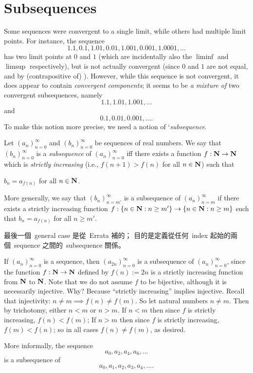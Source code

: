\section{Subsequences} \label{sec 6.6}

Some sequences were convergent to a single limit, while others had multiple limit points.
For instance, the sequence
\[
    1.1, 0.1, 1.01, 0.01, 1.001, 0.001, 1.0001,...
\]
has two limit points at \(0\) and \(1\) (which are incidentally also the \(\liminf\) and \(\limsup\) respectively),
but is not actually convergent (since \(0\) and \(1\) are not equal, and by (contrapositive of) ).
However, while this sequence is not convergent, it does appear to contain \emph{convergent components};
it seems to be \emph{a mixture of} two convergent subsequences, namely
\[
    1.1, 1.01, 1.001,...
\]
and
\[
    0.1, 0.01, 0.001,....
\]
To make this notion more precise, we need a notion of `\emph{subsequence}.

\begin{definition} [Subsequences] \label{def 6.6.1}
Let \((a_n)_{n = 0}^{\infty}\) and \((b_n)_{n = 0}^{\infty}\) be sequences of real numbers.
We say that \((b_n)_{n = 0}^{\infty}\) is a \emph{subsequence} of \((a_n)_{n = 0}^{\infty}\)
iff there exists a function \(f : \mathbf{N} \rightarrow \mathbf{N}\) which is \emph{strictly increasing}
(i.e., \(f(n +1 ) > f(n)\) for all \(n \in \mathbf{N}\)) such that
\begin{center}
    \(b_n = a_{f(n)}\) for all \(n \in \mathbf{N}\).
\end{center}

More generally, we say that \((b_n)_{n=m'}^{\infty}\) is a subsequence of \((a_n)_{n=m}^{\infty}\) if there exists a strictly increasing function \(f: \{ n \in \mathbf{N}: n \ge m'\} \to \{ n \in \mathbf{N}: n \ge m\}\) such that \(b_n = a_{f(n)}\) for all \(n \ge m'\).
\end{definition}

\begin{note}
最後一個\ general case 是從\ Errata 補的；
目的是定義從任何\ index 起始的兩個\ sequence 之間的\ subsequence 關係。
\end{note}

\begin{example} \label{example 6.6.2}
If \((a_n)_{n = 0}^{\infty}\) is a sequence, then \((a_{2n})_{n = 0}^{\infty}\) is a subsequence of \((a_n)_{n = 0}^{\infty}\),
since the function \(f : \mathbf{N} \rightarrow \mathbf{N}\) defined by \(f(n) := 2n\) is a strictly increasing function from \(\mathbf{N}\) to \(\mathbf{N}\).
Note that we do not assume \(f\) to be bijective, although it is necessarily injective.
Why? Because ``strictly increasing'' implies injective.
Recall that injectivity: \(n \ne m \implies f(n) \ne f(m)\).
So let natural numbers \(n \ne m\).
Then by trichotomy, either \(n < m\) or \(n > m\).
If \(n < m\) then since \(f\) is strictly increasing, \(f(n) < f(m)\);
If \(n > m\) then since \(f\) is strictly increasing, \(f(m) < f(n)\);
so in all cases \(f(n) \ne f(m)\), as desired.

More informally, the sequence
\[
    a_0, a_2, a_4, a_6,...
\]
is a subsequence of
\[
    a_0, a_1, a_2, a_3, a_4,....
\]
\end{example}

